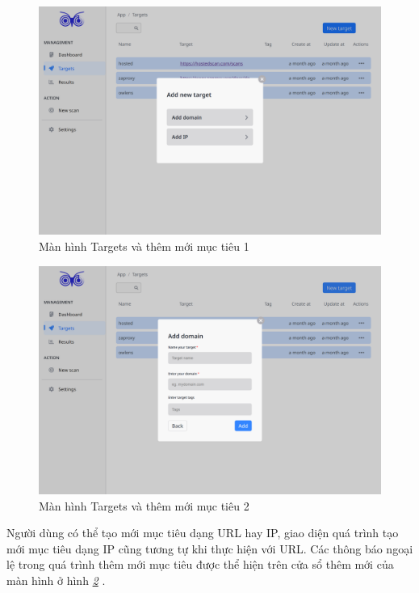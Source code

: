 \begin{figure}[H]
      \centering
      \includegraphics[width=\textwidth]{applied-thesis-chapters/chapter-6/Màn hình Targets và thêm mới mục tiêu 1.png}
      \caption{Màn hình Targets và thêm mới mục tiêu 1}
      \label{fig:ManHinhTargetsVaThemMoiMucTieu1}
\end{figure}

\begin{figure}[H]
      \centering
      \includegraphics[width=\textwidth]{applied-thesis-chapters/chapter-6/Màn hình Targets và thêm mới mục tiêu 2.png}
      \caption{Màn hình Targets và thêm mới mục tiêu 2}
      \label{fig:ManHinhTargetsVaThemMoiMucTieu2}
\end{figure}

Người dùng có thể tạo mới mục tiêu dạng URL hay IP, giao diện quá trình tạo mới mục tiêu dạng IP cũng tương tự khi thực hiện với URL.
Các thông báo ngoại lệ trong quá trình thêm mới mục tiêu được thể hiện trên cửa sổ thêm mới của màn hình ở hình \textit{\ref{fig:ManHinhTargetsVaThemMoiMucTieu2} }.


